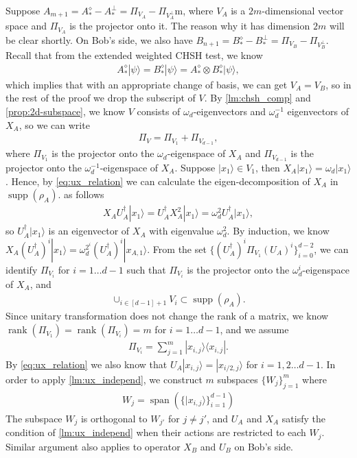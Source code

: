 \documentclass[11pt,letterpaper]{article}
\newcommand{\ket}[1]{|#1\rangle}
\newcommand{\ketbra}[2]{|#1\rangle\langle#2|}
\newcommand{\x}{\otimes}
\DeclareMathOperator{\spn}{span}
\DeclareMathOperator{\rank}{rank}
\DeclareMathOperator{\supp}{supp}
\newcommand{\1}{\mathbb{1}}
\theoremstyle{definition}
\begin{document}
Suppose $A_{m+1} = A_\ast^\diamond- A_\ast^\perp = \Pi_{V_A} - \Pi_{V_A^\perp}$m, where $V_A$ is a
$2m$-dimensional vector space and $\Pi_{V_A}$ is the projector onto it. The reason why it has dimension $2m$
will be clear shortly. On Bob's side, we also have $B_{n+1} = B_\ast^\diamond- B_\ast^\perp = \Pi_{V_B} - \Pi_{V_B^\perp}$.
Recall that from the extended weighted CHSH test, we know
\begin{align}
	A_\ast^\diamond \ket{\psi} = B_\ast^\diamond \ket{\psi} = A_\ast^\diamond \x B_\ast^\diamond \ket{\psi},
\end{align}
which implies that with an appropriate change of basis, we can get $V_A = V_B$, so in the rest of the proof
we drop the subscript of $V$.
By \cref{lm:chsh_comp} and \cref{prop:2d-subspace}, we know $V$ consists of $\omega_d$-eigenvectors and $\omega_d^{-1}$ eigenvectors of 
$X_A$, so we can write 
\begin{align}
	\Pi_{V} = \Pi_{V_1} + \Pi_{V_{d-1}},
\end{align}
where $\Pi_{V_{1}}$ is the projector onto the $\omega_d$-eigenspace of $X_A$ and $\Pi_{V_{d-1}}$ is the projector 
onto the $\omega_d^{-1}$-eigenspace of $X_A$.
Suppose $\ket{x_{1}} \in V_{1}$, then $X_A \ket{x_{1}} = \omega_d \ket{x_{1}}$.
Hence, by \cref{eq:ux_relation} we can calculate the eigen-decomposition of $X_A$ in $\supp(\rho_A)$.
as follows
\begin{align}
\label{eq:ladder}
 X_AU_A^\dagger \ket{x_{1}} = U_A^\dagger X_A^2 \ket{x_{1}} = \omega_d^2 U_A^\dagger \ket{x_{1}},
\end{align}
so $U_A^\dagger \ket{x_{1}}$ is an eigenvector of $X_A$ with eigenvalue $\omega_d^2$.
By induction, we know $X_A (U_A^\dagger)^i \ket{x_{1}} = \omega_d^{2^i} (U_A^\dagger)^i\ket{x_{A,1}}$. 
From the set $\{(U_A^\dagger)^i \Pi_{V_1} (U_A)^i \}_{i=0}^{d-2}$, we can identify $\Pi_{V_i}$ for $i = 1 \dots  d-1$
such that $\Pi_{V_i}$ is the projector onto the $\omega_d^i$-eigenspace of $X_A$,
and 
\begin{align}
 \cup_{i \in [d-1]+1} V_i \subset \supp(\rho_A).
\end{align}
Since unitary transformation does not change the rank of a matrix, we know $\rank(\Pi_{V_1}) = \rank(\Pi_{V_{i}}) =m$
for $ i =1 \dots d-1$,
and we assume 
\begin{align}
 \Pi_{V_i} = \sum_{j=1}^m \ketbra{x_{i,j}}{x_{i,j}}.
\end{align}
By \cref{eq:ux_relation} we also know that $U_A \ket{x_{i,j}} = \ket{x_{i/2,j}}$ for $i = 1,2 \dots d-1$.
In order to apply \cref{lm:ux_independ}, we construct $m$ subspaces $\{W_j\}_{j=1}^m$ where 
\begin{align}
	W_j = \spn( \{ \ket{x_{i,j}} \}_{i=1}^{d-1} )
\end{align}
The subspace $W_j$ is orthogonal to $W_{j'}$ for $j \neq j'$, and
$U_A$ and $X_A$ satisfy the condition of \cref{lm:ux_independ} when their actions are 
restricted to each $W_j$.
Similar argument also applies to operator $X_B$ and $U_B$ on Bob's side.
\end{document}
